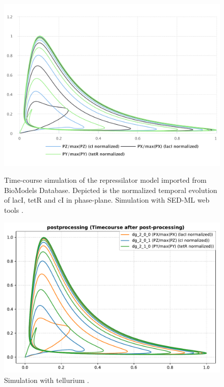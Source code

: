 \begin{figure}[ht]
    \centering
    \begin{minipage}{0.47\textwidth}
        \centering
        \includegraphics[width=1.0\textwidth]{examples/repressilator/results/sedml_webtools/postprocessing}
        \caption{Time-course simulation of the repressilator model imported from BioModels Database. Depicted is the normalized temporal evolution of lacI, tetR and cI in phase-plane. Simulation with SED-ML web tools \citep{bergmann2017sed}.}
    \end{minipage}\hfill
    \begin{minipage}{0.47\textwidth}
        \centering
        \includegraphics[width=1.0\textwidth]{examples/repressilator/results/tellurium/postprocessing}
        \caption{Simulation with tellurium \citep{tellurium}.}
    \end{minipage}
    \label{fig:rep_post}
\end{figure}

